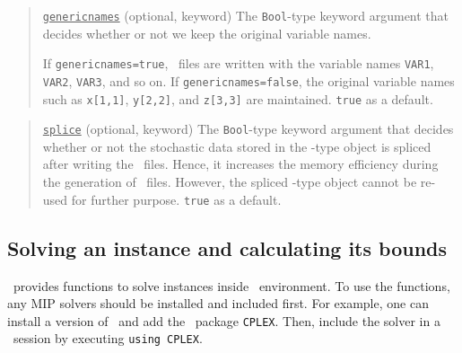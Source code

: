 \begin{quote}
	\noindent\underline{\texttt{genericnames}} (optional, keyword) The \texttt{Bool}-type keyword argument that decides whether or not we keep the original variable names. 
	
	If \texttt{genericnames=true}, \smps\ files are written with the variable names \texttt{VAR1}, \texttt{VAR2}, \texttt{VAR3}, and so on. If \texttt{genericnames=false}, the original variable names such as \texttt{x[1,1]}, \texttt{y[2,2]}, and \texttt{z[3,3]} are maintained. \texttt{true} as a default.
\end{quote}

\begin{quote}
	\noindent\underline{\texttt{splice}} (optional, keyword) The \texttt{Bool}-type keyword argument that decides whether or not the stochastic data stored in the \jumpmodel-type object is spliced after writing the \smps\ files. Hence, it increases the memory efficiency during the generation of \smps\ files. However, the spliced \jumpmodel-type object cannot be re-used for further purpose. \texttt{true} as a default.
\end{quote}


%
%

\subsection{Solving an instance and calculating its bounds} \label{tutorial:solve_instance}
\siplibjl\ provides functions to solve instances inside \julia\ environment. To use the functions, any MIP solvers should be installed and included first. For example, one can install a version of \cplex\ and add the \julia\ package \texttt{CPLEX}. Then, include the solver in a \julia\ session by executing \texttt{using CPLEX}.
